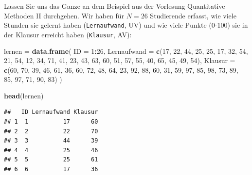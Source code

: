\documentclass[
]{book}
\newenvironment{Shaded}{\begin{snugshade}}{\end{snugshade}}
\newcommand{\AttributeTok}[1]{\textcolor[rgb]{0.13,0.29,0.53}{#1}}
\newcommand{\DecValTok}[1]{\textcolor[rgb]{0.00,0.00,0.81}{#1}}
\newcommand{\FunctionTok}[1]{\textcolor[rgb]{0.13,0.29,0.53}{\textbf{#1}}}
\newcommand{\NormalTok}[1]{#1}
\newcommand{\OtherTok}[1]{\textcolor[rgb]{0.56,0.35,0.01}{#1}}
\newcommand{\SpecialCharTok}[1]{\textcolor[rgb]{0.81,0.36,0.00}{\textbf{#1}}}
\begin{document}
Lassen Sie uns das Ganze an dem Beispiel aus der Vorlesung Quantitative Methoden II durchgehen. Wir haben für \(N=26\) Studierende erfasst, wie viele Stunden sie gelernt haben (\texttt{Lernaufwand}, UV) und wie viele Punkte (0-100) sie in der Klausur erreicht haben (\texttt{Klausur}, AV):

\begin{Shaded}
\begin{Highlighting}[]
\NormalTok{lernen }\OtherTok{=} \FunctionTok{data.frame}\NormalTok{(}
  \AttributeTok{ID =} \DecValTok{1}\SpecialCharTok{:}\DecValTok{26}\NormalTok{,}
  \AttributeTok{Lernaufwand =} \FunctionTok{c}\NormalTok{(}\DecValTok{17}\NormalTok{, }\DecValTok{22}\NormalTok{, }\DecValTok{44}\NormalTok{, }\DecValTok{25}\NormalTok{, }\DecValTok{25}\NormalTok{, }\DecValTok{17}\NormalTok{, }\DecValTok{32}\NormalTok{, }\DecValTok{54}\NormalTok{, }\DecValTok{21}\NormalTok{, }\DecValTok{54}\NormalTok{, }\DecValTok{12}\NormalTok{, }\DecValTok{34}\NormalTok{, }\DecValTok{71}\NormalTok{,}
                  \DecValTok{41}\NormalTok{, }\DecValTok{23}\NormalTok{, }\DecValTok{43}\NormalTok{, }\DecValTok{63}\NormalTok{, }\DecValTok{60}\NormalTok{, }\DecValTok{51}\NormalTok{, }\DecValTok{57}\NormalTok{, }\DecValTok{55}\NormalTok{, }\DecValTok{40}\NormalTok{, }\DecValTok{65}\NormalTok{, }\DecValTok{45}\NormalTok{, }\DecValTok{49}\NormalTok{, }\DecValTok{54}\NormalTok{),}
  \AttributeTok{Klausur =} \FunctionTok{c}\NormalTok{(}\DecValTok{60}\NormalTok{, }\DecValTok{70}\NormalTok{, }\DecValTok{39}\NormalTok{, }\DecValTok{46}\NormalTok{, }\DecValTok{61}\NormalTok{, }\DecValTok{36}\NormalTok{, }\DecValTok{60}\NormalTok{, }\DecValTok{72}\NormalTok{, }\DecValTok{48}\NormalTok{, }\DecValTok{64}\NormalTok{, }\DecValTok{23}\NormalTok{, }\DecValTok{92}\NormalTok{, }\DecValTok{88}\NormalTok{,}
              \DecValTok{60}\NormalTok{, }\DecValTok{31}\NormalTok{, }\DecValTok{59}\NormalTok{, }\DecValTok{97}\NormalTok{, }\DecValTok{85}\NormalTok{, }\DecValTok{98}\NormalTok{, }\DecValTok{73}\NormalTok{, }\DecValTok{89}\NormalTok{, }\DecValTok{85}\NormalTok{, }\DecValTok{97}\NormalTok{, }\DecValTok{71}\NormalTok{, }\DecValTok{90}\NormalTok{, }\DecValTok{83}\NormalTok{)}
\NormalTok{)}

\FunctionTok{head}\NormalTok{(lernen)}
\end{Highlighting}
\end{Shaded}

\begin{verbatim}
##   ID Lernaufwand Klausur
## 1  1          17      60
## 2  2          22      70
## 3  3          44      39
## 4  4          25      46
## 5  5          25      61
## 6  6          17      36
\end{verbatim}
\end{document}
